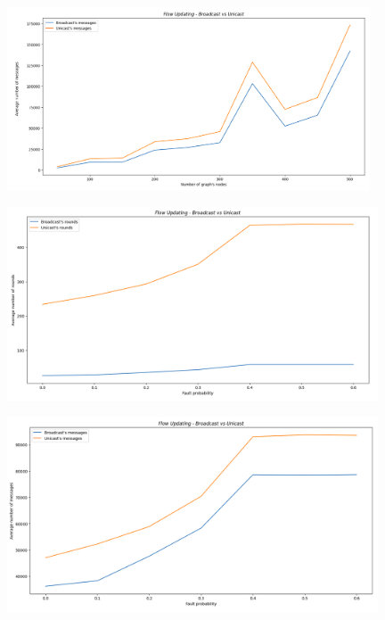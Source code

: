 \documentclass[a4paper]{report}
\begin{document}
{	\begin{figure}[H]
		\centering
		\includegraphics[width=0.96\textwidth]{Images/Plot2.png}
		\label{fig:2}
	\end{figure}

	\begin{figure}[H]
		\centering
		\includegraphics[width=0.98\textwidth]{Images/Plot3.png}
		\label{fig:3}
	\end{figure}

	\begin{figure}[H]
		\centering
		\includegraphics[width=0.98\textwidth]{Images/Plot4.png}
		\label{fig:4}
	\end{figure}
}
\end{document}
